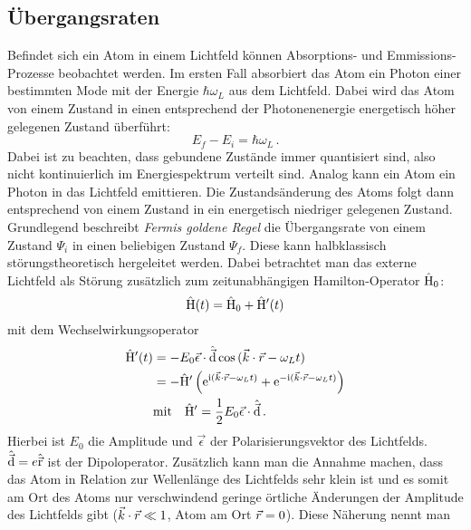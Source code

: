 \subsection{Übergangsraten}\label{subsec:uebergangsraten}
Befindet sich ein Atom in einem Lichtfeld können Absorptions- und
Emmissions-Prozesse beobachtet werden. Im ersten Fall absorbiert das Atom ein
Photon einer bestimmten Mode mit der Energie $\hbar\omega_L$ aus dem Lichtfeld.
Dabei wird das Atom von einem Zustand in einen entsprechend der Photonenenergie
energetisch höher gelegenen Zustand überführt:
\begin{equation}\label{eq:uebergang}
	E_f-E_i=\hbar\omega_L \, .
\end{equation}
Dabei ist zu beachten, dass gebundene Zustände immer quantisiert sind, also
nicht kontinuierlich im Energiespektrum verteilt sind. Analog kann ein Atom ein
Photon in das Lichtfeld emittieren. Die Zustandsänderung des Atoms folgt dann entsprechend von einem Zustand in ein energetisch niedriger gelegenen
Zustand.\\
Grundlegend beschreibt \textit{Fermis goldene Regel} die
Übergangsrate von einem Zustand $\Psi_i$ in einen beliebigen
Zustand $\Psi_f$. Diese kann halbklassisch störungstheoretisch hergeleitet
werden.  Dabei betrachtet man das externe Lichtfeld als Störung
zusätzlich zum zeitunabhängigen Hamilton-Operator $\hat{\mathrm{H}}_0$:
\begin{equation}\label{eq:hamilton}
	\hat{\mathrm{H}}(t)=\hat{\mathrm{H}}_0+\hat{\mathrm{H}}'(t)
\end{equation}
mit dem Wechselwirkungsoperator
\begin{equation}\label{eq:ww}
	\begin{split}
		\hat{\mathrm{H}}'(t) &= -E_0\vec{\epsilon}\cdot\hat{\vec{\mathrm{d}}}\cos{(\vec{k}\cdot\vec{r}-\omega_L t)}\\
		&=
		-\hat{\mathrm{H}}'\left(\mathrm{e}^{\mathrm{i}(\vec{k}\cdot\vec{r}-\omega_L
		t)}+\mathrm{e}^{-\mathrm{i}(\vec{k}\cdot\vec{r}-\omega_L t)}\right)\\
		&\text{mit}\quad
		\hat{\mathrm{H}}'=\frac{1}{2}E_0\vec{\epsilon}\cdot\hat{\vec{\mathrm{d}}}\,.
	\end{split}
\end{equation}
Hierbei ist $E_0$ die Amplitude und $\vec{\epsilon}$ der
Polarisierungsvektor des Lichtfelds. $\hat{\vec{\mathrm{d}}} = e\hat{\vec{\mathrm{r}}}$ ist der Dipoloperator. 
Zusätzlich kann man die Annahme machen, dass das Atom in Relation zur
Wellenlänge des Lichtfelds sehr klein ist und es somit am Ort des Atoms nur verschwindend geringe örtliche Änderungen der Amplitude des Lichtfelds gibt
($\vec{k}\cdot\vec{r}\ll 1$, Atom am Ort $\vec{r}=0$). Diese Näherung nennt man
